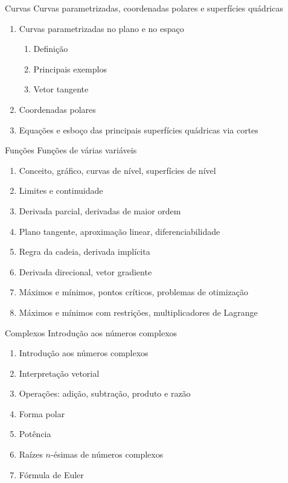 \documentclass[fleqn,utf8,aspectratio=169,12pt]{beamer}
\begin{document}
\begin{frame}{Curvas}
  Curvas parametrizadas, coordenadas polares e superfícies quádricas
  \begin{enumerate}[<+->]
    \item Curvas parametrizadas no plano e no espaço
    \begin{enumerate}
      \item Definição
      \item Principais exemplos
      \item Vetor tangente
    \end{enumerate}
    \item Coordenadas polares
    \item Equações e esboço das principais superfícies quádricas via cortes
  \end{enumerate}
\end{frame}

\begin{frame}{Funções}
  Funções de várias variáveis
  \begin{enumerate}[<+->]
    \item Conceito, gráfico, curvas de nível, superfícies de nível
    \item Limites e continuidade
    \item Derivada parcial, derivadas de maior ordem
    \item Plano tangente, aproximação linear, diferenciabilidade
    \item Regra da cadeia, derivada implícita
    \item Derivada direcional, vetor gradiente
    \item Máximos e mínimos, pontos críticos, problemas de otimização
    \item Máximos e mínimos com restrições, multiplicadores de Lagrange
  \end{enumerate}
\end{frame}

\begin{frame}{Complexos}
  Introdução aos números complexos
  \begin{enumerate}[<+->]
    \item Introdução aos números complexos
    \item Interpretação vetorial
    \item Operações: adição, subtração, produto e razão
    \item Forma polar
    \item Potência
    \item Raízes $n$-ésimas de números complexos
    \item Fórmula de Euler
  \end{enumerate}
\end{frame}
\end{document}
